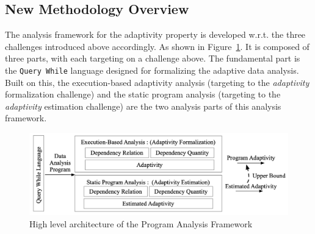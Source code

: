 
\subsection{New Methodology Overview }
\label{sec:intro-adapt-method}
The analysis framework for the adaptivity property is 
developed w.r.t. the three challenges introduced above accordingly.
As shown in Figure~\ref{fig:structure}.
It is composed of three parts, with each targeting on a challenge above.
The fundamental part is the {\tt Query While} language designed for formalizing the 
adaptive data analysis. Built on this, 
the execution-based adaptivity analysis (targeting to the \emph{adaptivity} formalization challenge)
and the static program analysis (targeting to the \emph{adaptivity} estimation challenge) 
are the two analysis parts of this 
analysis framework.
\begin{figure}
   \centering   
   \includegraphics[width=1.0\textwidth]{figures/overview.png}
  \caption{High level architecture of the Program Analysis Framework}
   \label{fig:structure}
\end{figure}

